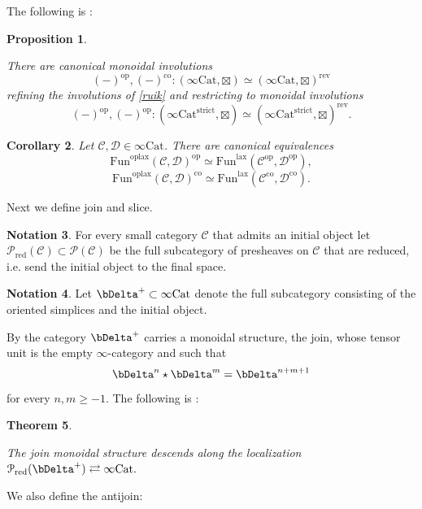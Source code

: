 \documentclass[10pt,oneside]{article}
\numberwithin{equation}{section} %
\numberwithin{figure}{section} %
\theoremstyle{plain}
\newtheorem{theorem}{Theorem}[subsection]
\newtheorem{proposition}[theorem]{Proposition}
\newtheorem{corollary}[theorem]{Corollary}
\theoremstyle{definition}
\newtheorem{notation}[theorem]{Notation}
\newcommand{\mC}{{\mathcal C}}
\newcommand{\mD}{{\mathcal D}}
\newcommand{\mP}{{\mathcal P}}
\newcommand{\op}{\mathrm{op}}
\newcommand{\rev}{{\mathrm{rev}}}
\newcommand{\co}{\mathrm{co}}
\newcommand{\Cat}{\mathrm{Cat}}
\newcommand{\Fun}{\mathrm{Fun}}
\newcommand{\lax}{{\mathrm{lax}}}
\newcommand{\oplax}{{\mathrm{oplax}}}
\begin{document}
The following is \cite[Proposition 3.5.9.]{GepnerHeine2026}: 
\begin{proposition}\label{dua}
	
There are canonical monoidal involutions
$$(-)^\op, (-)^\co: (\infty\Cat, \boxtimes) \simeq (\infty\Cat, \boxtimes)^\rev $$
refining the involutions of \cref{ruik} and restricting to 
monoidal involutions
$$(-)^\op, (-)^\op: (\infty\Cat^{\mathrm{strict}}, \boxtimes) \simeq (\infty\Cat^{\mathrm{strict}}, \boxtimes)^\rev.$$
\end{proposition}



\begin{corollary}\label{grayhoms}
Let $\mC,\mD \in \infty\Cat$.
There are canonical equivalences $$ \Fun^\oplax(\mC,\mD)^\op \simeq \Fun^\lax(\mC^\op,\mD^\op), $$$$\Fun^\oplax(\mC,\mD)^\co \simeq \Fun^\lax(\mC^\co,\mD^\co).$$	
\end{corollary}



Next we define join and slice.

\begin{notation} For every small category $\mC$ that admits an initial object let $ \mP_{\mathrm{red}}(\mC) \subset \mP(\mC) $  
be the full subcategory of presheaves on $\mC$
that are reduced, i.e. send the initial object to the final space.
\end{notation}


\begin{notation}

Let $\bDelta^+\subset\infty\Cat$ denote the full subcategory consisting of the oriented simplices and the initial object. 

\end{notation}

By \cite[Definition 2.6.30.]{GepnerHeine2026} the category $\bDelta^+$ carries a monoidal structure, the join,
whose tensor unit is the empty $\infty$-category and such that $$\bDelta^n \star \bDelta^m = \bDelta^{n+m+1}$$ for every $n,m \geq -1.$
The following is \cite[Corollary 3.5.8.]{GepnerHeine2026}:

\begin{theorem}\label{locmon4}

The join monoidal structure descends along the localization $\mP_{\mathrm{red}}(\bDelta^+) \rightleftarrows \infty\Cat. $

\end{theorem} 

We also define the antijoin:
\end{document}
